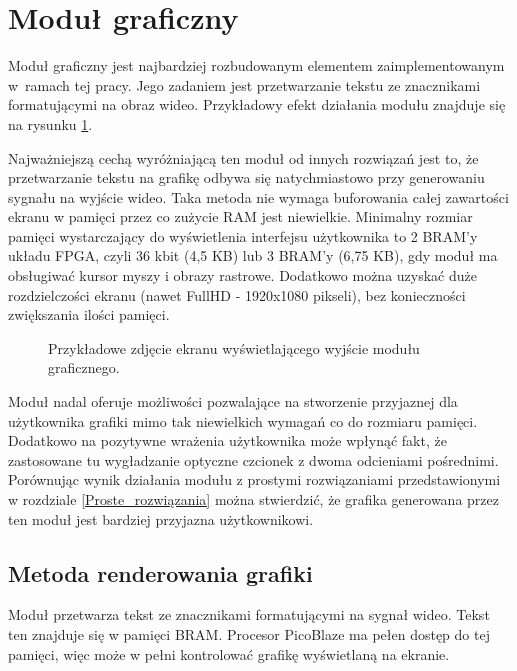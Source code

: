 
\rozdzial

\section{Moduł graficzny}

Moduł graficzny jest najbardziej rozbudowanym elementem zaimplementowanym w~ramach tej pracy. Jego zadaniem jest przetwarzanie tekstu ze znacznikami formatującymi na obraz wideo. Przykładowy efekt działania modułu znajduje się na rysunku \ref{guiScreenExample}.

Najważniejszą cechą wyróżniającą ten moduł od innych rozwiązań jest to, że przetwarzanie tekstu na grafikę odbywa się natychmiastowo przy generowaniu sygnału na wyjście wideo. Taka metoda nie wymaga buforowania całej zawartości ekranu w pamięci przez co zużycie RAM jest niewielkie. Minimalny rozmiar pamięci wystarczający do wyświetlenia interfejsu użytkownika to 2 BRAM'y układu FPGA, czyli 36 kbit (4,5 KB) lub 3 BRAM'y (6,75 KB), gdy moduł ma obsługiwać kursor myszy i obrazy rastrowe. Dodatkowo można uzyskać duże rozdzielczości ekranu (nawet FullHD - 1920x1080 pikseli), bez konieczności zwiększania ilości pamięci.

\begin{figure}[htb]
	\centering
	\caption{Przykładowe zdjęcie ekranu wyświetlającego wyjście modułu graficznego.}
	\label{guiScreenExample}
\end{figure}


Moduł nadal oferuje możliwości pozwalające na stworzenie przyjaznej dla użytkownika grafiki mimo tak niewielkich wymagań co do rozmiaru pamięci. Dodatkowo na pozytywne wrażenia użytkownika może wpłynąć fakt, że zastosowane tu wygładzanie optyczne czcionek z dwoma odcieniami pośrednimi. Porównując wynik działania modułu z prostymi rozwiązaniami przedstawionymi w rozdziale \ref{Proste_rozwiązania} można stwierdzić, że grafika generowana przez ten moduł jest bardziej przyjazna użytkownikowi.


\subsection{Metoda renderowania grafiki}
\label{MetodaRenderowaniaGrafiki}

Moduł przetwarza tekst ze znacznikami formatującymi na sygnał wideo. Tekst ten znajduje się w pamięci BRAM. Procesor PicoBlaze ma pełen dostęp do tej pamięci, więc może w pełni kontrolować grafikę wyświetlaną na ekranie.

